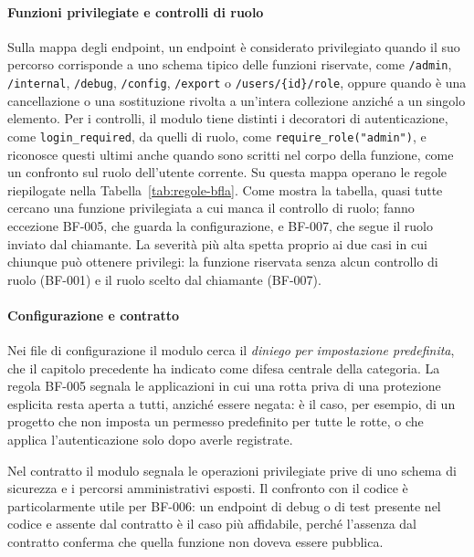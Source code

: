 \paragraph{Funzioni privilegiate e controlli di ruolo}
Sulla mappa degli endpoint, un endpoint è considerato privilegiato quando il
suo percorso corrisponde a uno schema tipico delle funzioni riservate, come
\texttt{/admin}, \texttt{/internal}, \texttt{/debug}, \texttt{/config},
\texttt{/export} o \texttt{/users/\{id\}/role}, oppure quando è una
cancellazione o una sostituzione rivolta a un'intera collezione anziché a un
singolo elemento. Per i controlli, il modulo tiene distinti i decoratori di
autenticazione, come \texttt{login\_required}, da quelli di ruolo, come
\texttt{require\_role("admin")}, e riconosce questi ultimi anche quando sono
scritti nel corpo della funzione, come un confronto sul ruolo dell'utente
corrente. Su questa mappa operano le regole riepilogate nella
Tabella~\ref{tab:regole-bfla}. Come mostra la tabella, quasi tutte cercano una
funzione privilegiata a cui manca il controllo di ruolo; fanno eccezione
BF-005, che guarda la configurazione, e BF-007, che segue il ruolo inviato dal
chiamante. La severità più alta spetta proprio ai due casi in cui chiunque può
ottenere privilegi: la funzione riservata senza alcun controllo di ruolo
(BF-001) e il ruolo scelto dal chiamante (BF-007).

\paragraph{Configurazione e contratto}
Nei file di configurazione il modulo cerca il \emph{diniego per impostazione
predefinita}, che il capitolo precedente ha indicato come difesa centrale della
categoria. La regola BF-005 segnala le applicazioni in cui una rotta priva di
una protezione esplicita resta aperta a tutti, anziché essere negata: è il
caso, per esempio, di un progetto che non imposta un permesso predefinito per
tutte le rotte, o che applica l'autenticazione solo dopo averle registrate.

Nel contratto il modulo segnala le operazioni privilegiate prive di uno schema
di sicurezza e i percorsi amministrativi esposti. Il confronto con il codice è
particolarmente utile per BF-006: un endpoint di debug o di test presente nel
codice e assente dal contratto è il caso più affidabile, perché l'assenza dal
contratto conferma che quella funzione non doveva essere pubblica.

